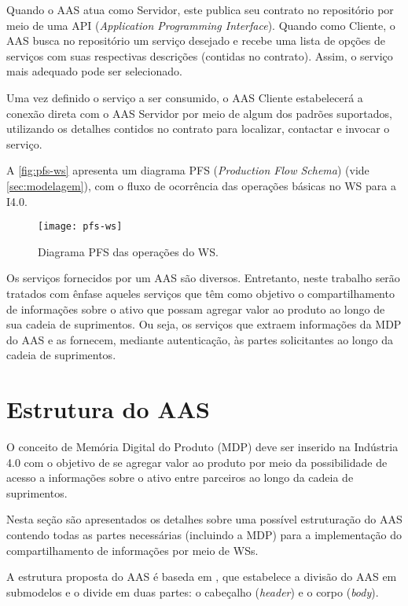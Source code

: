 Quando o AAS atua como Servidor, este publica seu contrato no repositório por meio de uma API (\textit{Application Programming Interface}). Quando como Cliente, o AAS busca no repositório um serviço desejado e recebe uma lista de opções de serviços com suas respectivas descrições (contidas no contrato). Assim, o serviço mais adequado pode ser selecionado.

Uma vez definido o serviço a ser consumido, o AAS Cliente estabelecerá a conexão direta com o AAS Servidor por meio de algum dos padrões suportados, utilizando os detalhes contidos no contrato para localizar, contactar e invocar o serviço.

A \autoref{fig:pfs-ws} apresenta um diagrama PFS (\textit{Production Flow Schema}) (vide \autoref{sec:modelagem}), com o fluxo de ocorrência das operações básicas no WS para a I4.0.

\begin{figure}[htb]
	\centering
	\texttt{[image: pfs-ws]}
	\caption{Diagrama PFS das operações do WS.}
	\label{fig:pfs-ws}
\end{figure}

Os serviços fornecidos por um AAS são diversos. Entretanto, neste trabalho serão tratados com ênfase aqueles serviços que têm como objetivo o compartilhamento de informações sobre o ativo que possam agregar valor ao produto ao longo de sua cadeia de suprimentos. Ou seja, os serviços que extraem informações da MDP do AAS e as fornecem, mediante autenticação, às partes solicitantes ao longo da cadeia de suprimentos.

\section{Estrutura do AAS}

O conceito de Memória Digital do Produto (MDP) deve ser inserido na Indústria 4.0 com o objetivo de se agregar valor ao produto por meio da possibilidade de acesso a informações sobre o ativo entre parceiros ao longo da cadeia de suprimentos.

Nesta seção são apresentados os detalhes sobre uma possível estruturação do AAS contendo todas as partes necessárias (incluindo a MDP) para a implementação do compartilhamento de informações por meio de WSs.

A estrutura proposta do AAS é baseda em , que estabelece a divisão do AAS em submodelos e o divide em duas partes: o cabeçalho (\textit{header}) e o corpo (\textit{body}).

